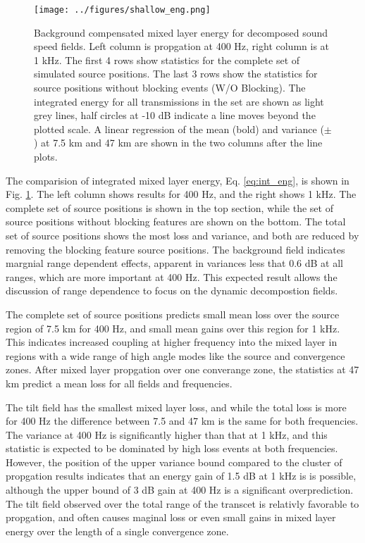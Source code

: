 \documentclass[preprint,NumberedRefs]{JASA}
\begin{document}
\begin{figure}
\texttt{[image: ../figures/shallow\_eng.png]}
    \caption{Background compensated mixed layer energy for decomposed sound speed fields. Left column is propgation at 400 Hz, right column is at 1 kHz. The first 4 rows show statistics for the complete set of simulated source positions. The last 3 rows show the statistics for source positions without blocking events (W/O Blocking). The integrated energy for all transmissions in the set are shown as light grey lines, half circles at -10 dB indicate a line moves beyond the plotted scale. A linear regression of the mean (bold) and variance ($\pm$) at 7.5 km and 47 km are shown in the two columns after the line plots.}
    \label{fig:shal_eng}
\end{figure}

The comparision of integrated mixed layer energy, Eq. \eqref{eq:int_eng}, is shown in Fig. \ref{fig:shal_eng}. The left column shows results for 400 Hz, and the right shows 1 kHz. The complete set of source positions is shown in the top section, while the set of source positions without blocking features are shown on the bottom. The total set of source positions shows the most loss and variance, and both are reduced by removing the blocking feature source positions. The background field indicates margnial range dependent effects, apparent in variances less that 0.6 dB at all ranges, which are more important at 400 Hz. This expected result allows the discussion of range dependence to focus on the dynamic decompostion fields.

The complete set of source positions predicts small mean loss over the source region of 7.5 km for 400 Hz, and small mean gains over this region for 1 kHz. This indicates increased coupling at higher frequency into the mixed layer in regions with a wide range of high angle modes like the source and convergence zones. After mixed layer propgation over one converange zone, the statistics at 47 km predict a mean loss for all fields and frequencies.

The tilt field has the smallest mixed layer loss, and while the total loss is more for 400 Hz the difference between 7.5 and 47 km is the same for both frequencies. The variance at 400 Hz is significantly higher than that at 1 kHz, and this statistic is expected to be dominated by high loss events at both frequencies. However, the position of the upper variance bound compared to the cluster of propgation results indicates that an energy gain of 1.5 dB at 1 kHz is is possible, although the upper bound of 3 dB gain at 400 Hz is a significant overprediction. The tilt field observed over the total range of the transcet is relativly favorable to propgation, and often causes maginal loss or even small gains in mixed layer energy over the length of a single convergence zone.
\end{document}
